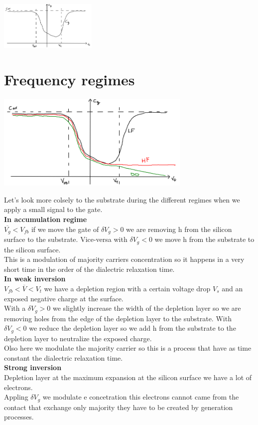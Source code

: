 \centering
\includegraphics[width=0.35\textwidth]{c-g1.png}\\
\raggedright


\section{Frequency regimes}

\centering
\includegraphics[width=0.7\textwidth]{c-gtot.png}\\
\raggedright

Let's look more colsely to the substrate during the different regimes when we apply a small signal to the gate.\\
{\bf In accumulation regime}\\
$\overline{V_g}<V_{fb}$ if we move the gate of $\delta V_g>0$ we are removing h from the silicon surface to the substrate. Vice-versa with $\delta V_g<0$ we move h from the substrate to the silicon surface.\\
This is a modulation of majority carriers concentration so it happens in a very short time in the order of the dialectric relaxation time.\\
{\bf In weak inversion}\\
$V_{fb}<\overline{V}<V_t$ we have a depletion region with a certain voltage drop $V_s$ and an exposed negative charge at the surface.\\
With a $\delta V_g>0$ we slightly increase the width of the depletion layer so we are removing holes from the edge of the depletion layer to the substrate. With $\delta V_g<0$ we reduce the depletion layer so we add h from the substrate to the depletion layer to neutralize the exposed charge.\\
Olso here we modulate the majority carrier so this is a process that have as time constant the dialectric relaxation time.\\
{\bf Strong inversion}\\
Depletion layer at the maximum expansion at the silicon surface we have a lot of electrons.\\ 
Appling $\delta V_g$ we modulate e concetration this electrons cannot came from the contact that exchange only majority they have to be created by generation processes.\\


